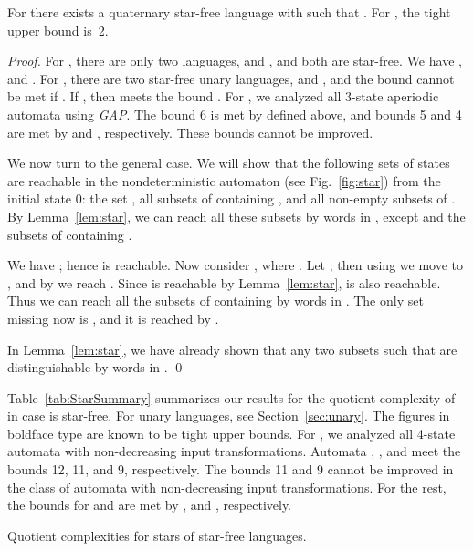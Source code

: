 \documentclass{llncs}
\begin{document}
\begin{theorem}
\label{thm:stars}
For  there exists a quaternary star-free language  with  such that .
For ,  the tight upper bound is~2. 
\end{theorem}
\begin{proof}
For , there are only two languages,  and , and both are star-free. We have , and . For , there are two star-free unary languages,  and , and the bound cannot be met if .  If , then  meets the bound .
For , we analyzed all 3-state aperiodic automata using \emph{GAP}.
The bound 6 is met by  defined above, and  bounds 5 and 4 are met by   and , respectively.
These bounds cannot be improved.

We now turn to  the general case. 
We will show that the following sets of states are reachable in  the nondeterministic automaton  (see Fig.~\ref{fig:star}) from the initial state 0: the set , all subsets of  containing , and all  
 non-empty subsets of .
By Lemma~\ref{lem:star}, we can reach 
all these subsets by words in , except 
 and the subsets of  containing .

We have
; hence  is reachable.
Now consider , where .
Let ; then using  we move to 
 ,  and by  we reach
. Since  is reachable by Lemma~\ref{lem:star},  is also reachable. Thus we can reach all the subsets of  containing  by words in .
The only set missing now is , and it is reached by .

In Lemma~\ref{lem:star}, we have already shown that any two subsets  such that  are distinguishable by words in .
\qed
\end{proof}



Table~\ref{tab:StarSummary} summarizes our results for the quotient complexity of  in case  is star-free. For unary languages, see Section~\ref{sec:unary}. The figures in boldface type are known to be tight upper bounds. 
For , we analyzed all 4-state automata with non-decreasing input transformations.
Automata ,  , and  meet the bounds 12,
11, and 9, respectively.
The bounds 11 and 9 cannot be improved in the class of automata with non-decreasing input transformations.
For the rest, the bounds for  and  are met by 
, and , respectively.

\setlength{\extrarowheight}{2pt}
\begin{table}[ht]
\caption{Quotient  complexities for stars of star-free languages.}
\label{tab:StarSummary}
\begin{center}

\end{center}
\end{table}
\end{document}
